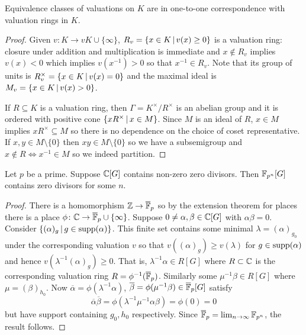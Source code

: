 \begin{proposition}
    Equivalence classes of valuations on $K$ are in one-to-one correspondence with valuation rings in $K$.
\end{proposition}

\begin{proof}
    Given $v \colon K \to vK \cup \{\infty\}$, $R_v = \left\{ x \in K \,\middle|\,  v(x) \geq 0  \right\}$ is a valuation ring: closure under addition and multiplication is immediate and $x \notin R_v$ implies $v(x) < 0$ which implies $v(x^{-1}) > 0$ so that $x^{-1} \in R_v$.
    Note that its group of units is $R_v^\times = \left\{ x \in K \,\middle|\, v(x) = 0 \right\}$ and the maximal ideal is $M_v = \left\{ x \in K \,\middle|\, v(x) > 0 \right\}$.

    If $R \subseteq K$ is a valuation ring, then $\Gamma = K^\times / R^\times$ is an abelian group and it is ordered with positive cone $\left\{ x R^\times \,\middle|\, x \in M \right\}$.
    Since $M$ is an ideal of $R$, $x \in M$ implies $x R^\times \subseteq M$ so there is no dependence on the choice of coset representative.
    If $x, y \in M \setminus \{0\}$ then $xy \in M \setminus \{0\}$ so we have a subsemigroup and $x \notin R \Leftrightarrow x^{-1} \in M$ so we indeed partition.
\end{proof}

\begin{corollary}
    \label{corollary:zdc_char_0_from_char_p}
    Let $p$ be a prime.
    Suppose $\mathbb{C}[G]$ contains non-zero zero divisors.
    Then $\mathbb{F}_{p^n}[G]$ contains zero divisors for some $n$.
\end{corollary}

\begin{proof}
    There is a homomorphism $\mathbb{Z} \to \overline{\mathbb{F}}_p$ so by the extension theorem for places there is a place $\phi \colon \mathbb{C} \to \overline{\mathbb{F}}_p \cup \{\infty\}$.
    Suppose $0 \neq \alpha, \beta \in \mathbb{C}[G]$ with $\alpha \beta = 0$.
    Consider $\left\{  (\alpha)_g  \,\middle|\,  g \in \operatorname{supp}(\alpha)  \right\}$.
    This finite set contains some minimal $\lambda = (\alpha)_{g_0}$ under the corresponding valuation $v$ so that $v((\alpha)_g) \geq v(\lambda)$ for $g \in \operatorname{supp}(\alpha)$ and hence $v(\lambda^{-1}(\alpha)_g) \geq 0$.
    That is, $\lambda^{-1} \alpha \in R[G]$ where $R \subset \mathbb{C}$ is the corresponding valuation ring $R = \phi^{-1}(\overline{\mathbb{F}}_p)$.
    Similarly some $\mu^{-1} \beta \in R[G]$ where $\mu = (\beta)_{h_0}$.
    Now $\overline{\alpha} = \phi(\lambda^{-1} \alpha)$, $\overline{\beta} = \phi(\mu^{-1} \beta) \in \overline{\mathbb{F}}_p[G]$ satisfy \[
        \overline{\alpha} \overline{\beta} = \phi(\lambda^{-1} \mu^{-1} \alpha \beta) = \phi(0) = 0
    \]
    but have support containing $g_0, h_0$ respectively.
    Since $\overline{\mathbb{F}}_p = \lim_{n \to \infty} \mathbb{F}_{p^n}$, the result follows.
\end{proof}

